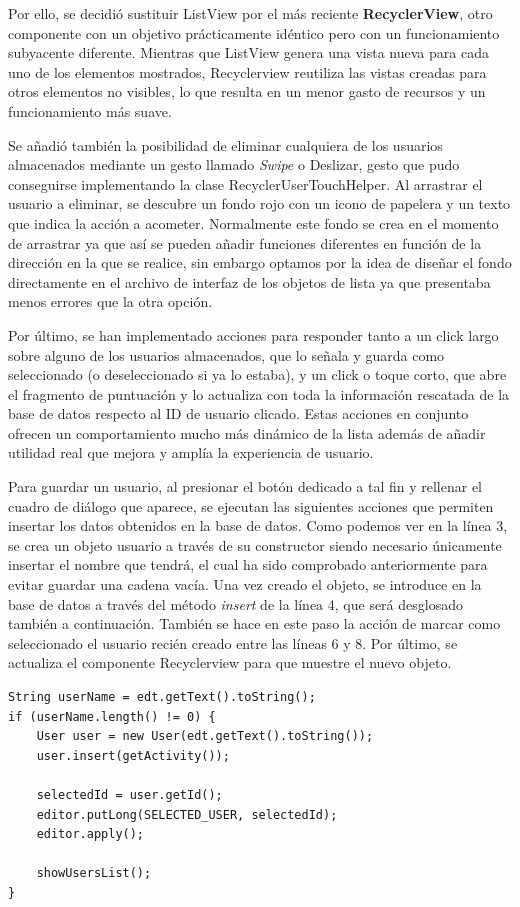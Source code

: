 Por ello, se decidió sustituir ListView por el más reciente \textbf{RecyclerView}, otro componente con un objetivo prácticamente idéntico pero con un funcionamiento subyacente diferente. Mientras que ListView genera una vista nueva para cada uno de los elementos mostrados, Recyclerview reutiliza las vistas creadas para otros elementos no visibles, lo que resulta en un menor gasto de recursos y un funcionamiento más suave.

Se añadió también la posibilidad de eliminar cualquiera de los usuarios almacenados mediante un gesto llamado \textit{Swipe} o Deslizar, gesto que pudo conseguirse implementando la clase RecyclerUserTouchHelper. Al arrastrar el usuario a eliminar, se descubre un fondo rojo con un icono de papelera y un texto que indica la acción a acometer. Normalmente este fondo se crea en el momento de arrastrar ya que así se pueden añadir funciones diferentes en función de la dirección en la que se realice, sin embargo optamos por la idea de diseñar el fondo directamente en el archivo de interfaz de los objetos de lista ya que presentaba menos errores que la otra opción.

Por último, se han implementado acciones para responder tanto a un click largo sobre alguno de los usuarios almacenados, que lo señala y guarda como seleccionado (o deseleccionado si ya lo estaba), y un click o toque corto, que abre el fragmento de puntuación y lo actualiza con toda la información rescatada de la base de datos respecto al ID de usuario clicado. Estas acciones en conjunto ofrecen un comportamiento mucho más dinámico de la lista además de añadir utilidad real que mejora y amplía la experiencia de usuario.

Para guardar un usuario, al presionar el botón dedicado a tal fin y rellenar el cuadro de diálogo que aparece, se ejecutan las siguientes acciones que permiten insertar los datos obtenidos en la base de datos. Como podemos ver en la línea 3, se crea un objeto usuario a través de su constructor siendo necesario únicamente insertar el nombre que tendrá, el cual ha sido comprobado anteriormente para evitar guardar una cadena vacía. Una vez creado el objeto, se introduce en la base de datos a través del método \textit{insert} de la línea 4, que será desglosado también a continuación. También se hace en este paso la acción de marcar como seleccionado el usuario recién creado entre las líneas 6 y 8. Por último, se actualiza el componente Recyclerview para que muestre el nuevo objeto.


\begin{lstlisting}
String userName = edt.getText().toString();
if (userName.length() != 0) {
    User user = new User(edt.getText().toString());
    user.insert(getActivity());

    selectedId = user.getId();
    editor.putLong(SELECTED_USER, selectedId);
    editor.apply();

    showUsersList();
}
\end{lstlisting}

